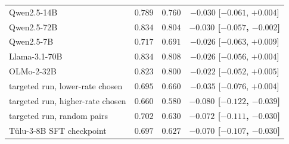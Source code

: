 \begin{table}[t]
\begin{tabular}{@{}lccc@{}}
Qwen2.5-14B & $0.789$ & $0.760$ & $-0.030$ [$-0.061$, $+0.004$] \\
Qwen2.5-72B & $0.834$ & $0.804$ & \textbf{$-0.030$ [$-0.057$, $-0.002$]} \\
Qwen2.5-7B & $0.717$ & $0.691$ & $-0.026$ [$-0.063$, $+0.009$] \\
Llama-3.1-70B & $0.834$ & $0.808$ & $-0.026$ [$-0.056$, $+0.004$] \\
OLMo-2-32B & $0.823$ & $0.800$ & $-0.022$ [$-0.052$, $+0.005$] \\
\midrule
targeted run, lower-rate chosen & $0.695$ & $0.660$ & $-0.035$ [$-0.076$, $+0.004$] \\
targeted run, higher-rate chosen & $0.660$ & $0.580$ & \textbf{$-0.080$ [$-0.122$, $-0.039$]} \\
targeted run, random pairs & $0.702$ & $0.630$ & \textbf{$-0.072$ [$-0.111$, $-0.030$]} \\
T\"ulu-3-8B SFT checkpoint & $0.697$ & $0.627$ & \textbf{$-0.070$ [$-0.107$, $-0.030$]} \\
\bottomrule
\end{tabular}
\end{table}
